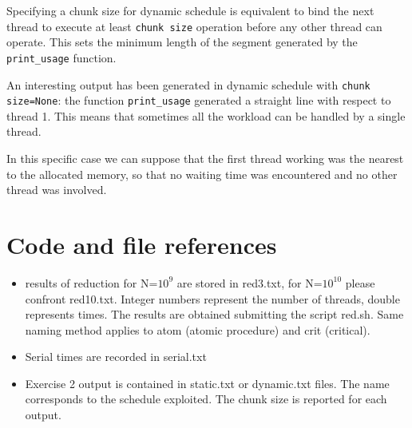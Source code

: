 \documentclass[10pt,a4paper]{article}
\begin{document}
Specifying a chunk size for dynamic schedule is equivalent to bind the next thread to execute at least \texttt{chunk size} operation before any other thread can operate. This sets the minimum length of the segment generated by the \texttt{print\_usage} function.

An interesting output has been generated in dynamic schedule with \texttt{chunk size=None}: the function \texttt{print\_usage} generated a straight line with respect to thread 1. This means that sometimes all the workload can be handled by a single thread.

In this specific case we can suppose that the first thread working was the nearest to the allocated memory, so that no waiting time was encountered and no other thread was involved.

\section*{Code and file references}

\begin{itemize}
	\item results of reduction for N=$10^9$ are stored in red3.txt, for N=$10^{10}$ please confront red10.txt. Integer numbers represent the number of threads, double represents times. The results are obtained submitting the script red.sh. Same naming method applies to atom (atomic procedure) and crit (critical).
	\item Serial times are recorded in serial.txt
	\item Exercise 2 output is contained in static.txt or dynamic.txt files. The name corresponds to the schedule exploited. The chunk size is reported for each output.
	\end{itemize}		
\end{document}

